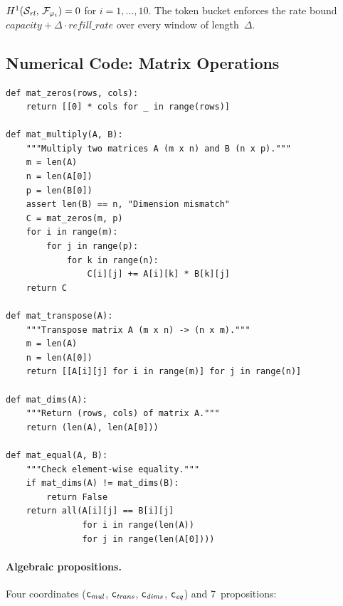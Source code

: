 \begin{theorem}\label{thm:ratelimiter}
$H^{1}(\mathcal{S}_{\mathit{rl}},\,\mathcal{F}_{\varphi_i}) = 0$ for
$i = 1,\ldots,10$.  The token bucket enforces the rate bound
$\mathit{capacity} + \Delta \cdot \mathit{refill\_rate}$ over
every window of length~$\Delta$.
\end{theorem}


\subsection{Numerical Code: Matrix Operations}\label{sec:app-matrix}

\begin{lstlisting}[style=jugeo-python,caption={Matrix multiply and transpose.},label={lst:matrix}]
def mat_zeros(rows, cols):
    return [[0] * cols for _ in range(rows)]

def mat_multiply(A, B):
    """Multiply two matrices A (m x n) and B (n x p)."""
    m = len(A)
    n = len(A[0])
    p = len(B[0])
    assert len(B) == n, "Dimension mismatch"
    C = mat_zeros(m, p)
    for i in range(m):
        for j in range(p):
            for k in range(n):
                C[i][j] += A[i][k] * B[k][j]
    return C

def mat_transpose(A):
    """Transpose matrix A (m x n) -> (n x m)."""
    m = len(A)
    n = len(A[0])
    return [[A[i][j] for i in range(m)] for j in range(n)]

def mat_dims(A):
    """Return (rows, cols) of matrix A."""
    return (len(A), len(A[0]))

def mat_equal(A, B):
    """Check element-wise equality."""
    if mat_dims(A) != mat_dims(B):
        return False
    return all(A[i][j] == B[i][j]
               for i in range(len(A))
               for j in range(len(A[0])))
\end{lstlisting}

\paragraph{Algebraic propositions.}
Four coordinates ($\mathsf{c}_{\mathit{mul}}$, $\mathsf{c}_{\mathit{trans}}$,
$\mathsf{c}_{\mathit{dims}}$, $\mathsf{c}_{\mathit{eq}}$) and
7~propositions:


